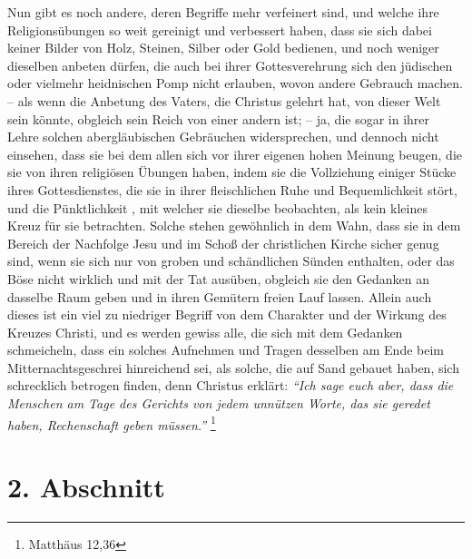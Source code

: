 Nun gibt es noch andere, deren Begriffe mehr
verfeinert sind, und welche ihre
Religionsübungen so weit
gereinigt und verbessert haben, dass sie sich dabei keiner Bilder von Holz,
Steinen, Silber oder Gold bedienen,
und noch weniger dieselben anbeten dürfen, die auch bei ihrer Gottesverehrung
sich den jüdischen  oder vielmehr heidnischen Pomp nicht
erlauben, wovon andere
Gebrauch
machen.  -- als wenn die Anbetung des Vaters, die Christus
gelehrt hat, von
dieser Welt sein könnte, obgleich sein Reich von einer andern ist; -- ja, die
sogar in ihrer Lehre solchen abergläubischen Gebräuchen widersprechen, und
dennoch nicht einsehen, dass sie bei dem allen sich vor ihrer eigenen hohen
Meinung beugen, die sie von ihren religiösen Übungen haben, indem sie die
Vollziehung einiger Stücke ihres Gottesdienstes, die sie in ihrer fleischlichen
Ruhe und Bequemlichkeit stört, und die Pünktlichkeit , mit
welcher sie dieselbe
beobachten, als
kein kleines Kreuz für sie betrachten. Solche stehen
gewöhnlich in dem Wahn,
dass sie in dem Bereich der Nachfolge Jesu und im Schoß der christlichen
Kirche sicher genug sind, wenn sie sich nur von groben und schändlichen Sünden
enthalten,   oder das Böse
nicht wirklich und mit der Tat ausüben, obgleich sie
den Gedanken an dasselbe Raum geben und in ihren Gemütern freien Lauf lassen.
Allein auch dieses ist ein viel zu niedriger Begriff von dem Charakter und der
Wirkung des Kreuzes Christi, und es werden gewiss alle, die sich mit dem
Gedanken schmeicheln, dass ein solches Aufnehmen und Tragen desselben am Ende
beim Mitternachtsgeschrei
hinreichend sei,   als
solche, die auf Sand
gebauet haben, sich schrecklich betrogen finden, denn Christus erklärt:
\textit{"`Ich sage euch aber, dass die Menschen am Tage des Gerichts von jedem
unnützen Worte, das sie geredet haben, Rechenschaft geben müssen."'}
\footnote{Matthäus 12,36}

\section{2. Abschnitt} \label{kap6_ab2}

